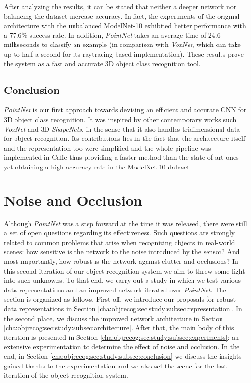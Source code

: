 After analyzing the results, it can be stated that neither a deeper network nor balancing the dataset increase accuracy. In fact, the experiments of the original architecture with the unbalanced ModelNet-10 exhibited better performance with a $77.6$\% success rate. In addition, \emph{PointNet} takes an average time of $24.6$ milliseconds to classify an example (in comparison with \emph{VoxNet}, which can take up to half a second for its raytracing-based implementation). These results prove the system as a fast and accurate \ac{3D} object class recognition tool.

\subsection{Conclusion}
\label{cha:objrecog:sec:pointnet:subsec:conclusion}

\emph{PointNet} is our first approach towards devising an efficient and accurate \ac{CNN} for \ac{3D} object class recognition. It was inspired by other contemporary works such \emph{VoxNet} and \ac{3D} \emph{ShapeNets}, in the sense that it also handles tridimensional data for object recognition. Its contributions lies in the fact that the architecture itself and the representation too were simplified and the whole pipeline was implemented in Caffe thus providing a faster method than the state of art ones yet obtaining a high accuracy rate in the ModelNet-10 dataset.

\section{Noise and Occlusion}
\label{cha:objrecog:sec:study}

Although \emph{PointNet} was a step forward at the time it was released, there were still a set of open questions regarding its effectiveness. Such questions are strongly related to common problems that arise when recognizing objects in real-world scenes: how sensitive is the network to the noise introduced by the sensor? And most importantly, how robust is the network against clutter and occlusions? In this second iteration of our object recognition system we aim to throw some light into such unknowns. To that end, we carry out a study in which we test various data representations and an improved network iterated over \emph{PointNet}. The section is organized as follows. First off, we introduce our proposals for robust data representations in Section \ref{cha:objrecog:sec:study:subsec:representation}. In the second place, we discuss the improved network architecture in Section \ref{cha:objrecog:sec:study:subsec:architecture}. After that, the main body of this iteration is presented in Section \ref{cha:objrecog:sec:study:subsec:experiments}: an extensive experimentation to determine the effect of noise and occlusion. In the end, in Section \ref{cha:objrecog:sec:study:subsec:conclusion} we discuss the insights gained thanks to the experimentation and we also set the scene for the last iteration of the object recognition system.

